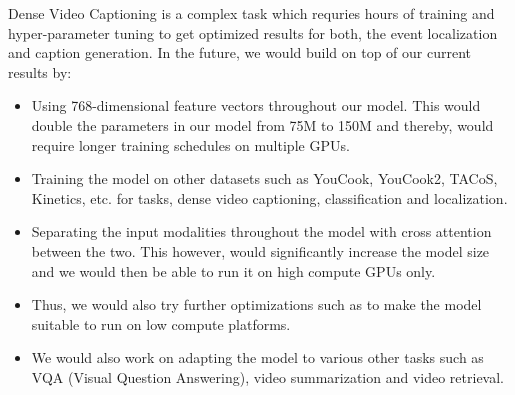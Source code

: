 \par Dense Video Captioning is a complex task which requries hours of training and hyper-parameter tuning to get optimized results for both, the event localization and caption generation. In the future, we would build on top of our current results by: 
\begin{itemize}
	\item Using 768-dimensional feature vectors throughout our model. This would double the parameters in our model from 75M to 150M and thereby, would require longer training schedules on multiple GPUs.
	\item Training the model on other datasets such as YouCook, YouCook2, TACoS, Kinetics, etc. for tasks, dense video captioning, classification and localization.
	\item Separating the input modalities throughout the model with cross attention between the two. This however, would significantly increase the model size and we would then be able to run it on high compute GPUs only. 
	\item Thus, we would also try further optimizations such as to make the model suitable to run on low compute platforms.
	\item We would also work on adapting the model to various other tasks such as VQA (Visual Question Answering), video summarization and video retrieval.
\end{itemize} 


